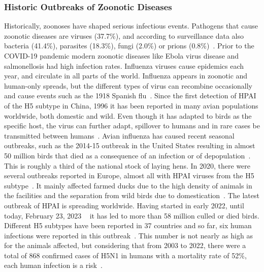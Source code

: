 \subsubsection*{Historic Outbreaks of Zoonotic Diseases}
Historically, zoonoses have shaped serious infectious events. Pathogens that cause zoonotic diseases are viruses (37.7\%), and according to surveillance data also bacteria (41.4\%), parasites (18.3\%), fungi (2.0\%) or prions (0.8\%)~\cite{salyer2017prioritizing}. Prior to the \ac{COVID-19} pandemic modern zoonotic diseases like Ebola virus disease and salmonellosis had high infection rates. Influenza viruses cause epidemics each year, and circulate in all parts of the world. Influenza appears in zoonotic and human-only spreads, but the different types of virus can recombine occasionally and cause events such as the 1918 Spanish flu~\cite{garten2009antigenic, gibbs2001recombination}. %
Since the first detection of \ac{HPAI} of the H5 subtype in China, 1996 it has been reported in many avian populations worldwide, both domestic and wild. Even though it has adapted to birds as the specific host, the virus can further adapt, spillover to humans and in rare cases be transmitted between humans~\cite{webster1992evolution}. Avian influenza has caused recent seasonal outbreaks, such as the 2014-15 outbreak in the United States resulting in almost 50 million birds that died as a consequence of an infection or of depopulation~\cite{lee2016highly}. This is roughly a third of the national stock of laying hens. In 2020, there were several outbreaks reported in Europe, almost all with \ac{HPAI} viruses from the H5 subtype~\cite{lewis2021emergence}. It mainly affected farmed ducks due to the high density of animals in the facilities and the separation from wild birds due to domestication~\cite{lewis2021emergence}. The latest outbreak of \ac{HPAI} is spreading worldwide. Having started in early 2022, until today, February 23, 2023 ~ it has led to more than 58 million culled or died birds. Different H5 subtypes have been reported in 37 countries and so far, six human infections were reported in this outbreak~\cite{authority2023avian}. This number is not nearly as high as for the animals affected, but considering that from 2003 to 2022, there were a total of 868 confirmed cases of H5N1 in humans with a mortality rate of 52\%, each human infection is a risk~\cite{authority2023avian}.


